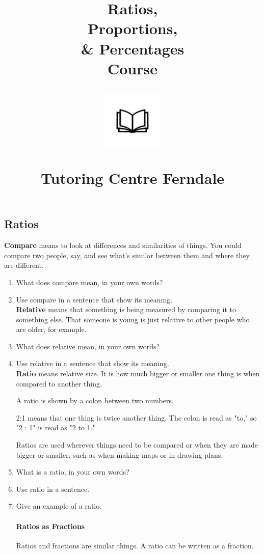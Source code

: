 \documentclass{article}
\author{}
\date{}
\title{Ratios,\\Proportions,\\\& Percentages\\Course\\
\begin{center}
\includegraphics[width=4em]{ApS_logo.png}
\end{center}
\begin{normalsize}
Tutoring Centre Ferndale
\end{normalsize}}
\begin{document}
\maketitle

\begin{spacing}{1.25}

\section*{Ratios}

\textbf{Compare} means to look at differences and similarities of things. You could compare two people, say, and see what's similar between them and where they are different.

\begin{enumerate}

\item What does compare mean, in your own words?
\item Use compare in a sentence that show its meaning.\\

\textbf{Relative} means that something is being measured by comparing it to something else. That someone is young is just relative to other people who are older, for example.

\item What does relative mean, in your own words?
\item Use relative in a sentence that show its meaning.\\

\textbf{Ratio} means relative size. It is how much bigger or smaller one thing is when compared to another thing.

A ratio is shown by a colon between two numbers.

2:1 means that one thing is twice another thing. The colon is read as "to," so "2 : 1" is read as "2 to 1."

Ratios are used wherever things need to be compared or when they are made bigger or smaller, such as when making maps or in drawing plans.

\item What is a ratio, in your own words?
\item Use ratio in a sentence.
\item Give an example of a ratio.

\paragraph{Ratios as Fractions}
Ratios and fractions are similar things. A ratio can be written as a fraction. 


\end{enumerate}
\end{spacing}
\end{document}
